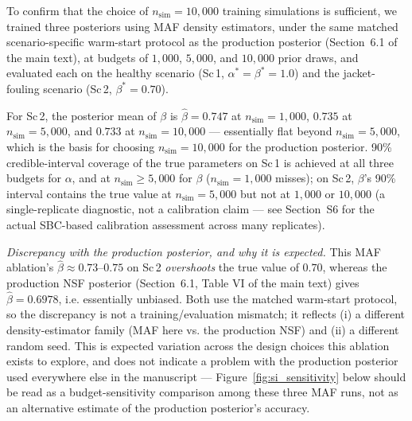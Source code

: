\documentclass[aps,pre,twocolumn,superscriptaddress]{revtex4-2}
\begin{document}
To confirm that the choice of $n_\mathrm{sim}=10{,}000$ training simulations is
sufficient, we trained three posteriors using MAF density estimators, under the same
matched scenario-specific warm-start protocol as the production posterior (Section~6.1
of the main text), at budgets of $1{,}000$, $5{,}000$, and $10{,}000$ prior draws, and
evaluated each on the healthy scenario (Sc\,1, $\alpha^*=\beta^*=1.0$) and the
jacket-fouling scenario (Sc\,2, $\beta^*=0.70$).

For Sc\,2, the posterior mean of $\beta$ is $\hat{\beta}=0.747$ at
$n_\mathrm{sim}=1{,}000$, $0.735$ at $n_\mathrm{sim}=5{,}000$, and $0.733$ at
$n_\mathrm{sim}=10{,}000$ --- essentially flat beyond $n_\mathrm{sim}=5{,}000$, which is
the basis for choosing $n_\mathrm{sim}=10{,}000$ for the production posterior. 90\%
credible-interval coverage of the true parameters on Sc\,1 is achieved at all three
budgets for $\alpha$, and at $n_\mathrm{sim}\geq5{,}000$ for $\beta$ ($n_\mathrm{sim}=
1{,}000$ misses); on Sc\,2, $\beta$'s 90\% interval contains the true value at
$n_\mathrm{sim}=5{,}000$ but not at $1{,}000$ or $10{,}000$ (a single-replicate
diagnostic, not a calibration claim --- see Section~S6 for the actual SBC-based
calibration assessment across many replicates).

\textit{Discrepancy with the production posterior, and why it is expected.} This MAF
ablation's $\hat\beta\approx0.73$--$0.75$ on Sc\,2 \emph{overshoots} the true value of
$0.70$, whereas the production NSF posterior (Section~6.1, Table VI
of the main text) gives $\hat\beta=0.6978$, i.e. essentially unbiased. Both use the
matched warm-start protocol, so the discrepancy is not a training/evaluation mismatch;
it reflects (i) a different density-estimator family (MAF here vs. the production NSF)
and (ii) a different random seed. This is expected variation across the design choices
this ablation exists to explore, and does not indicate a problem with the production
posterior used everywhere else in the manuscript --- Figure~\ref{fig:si_sensitivity}
below should be read as a budget-sensitivity comparison among these three MAF runs, not
as an alternative estimate of the production posterior's accuracy.
\end{document}
